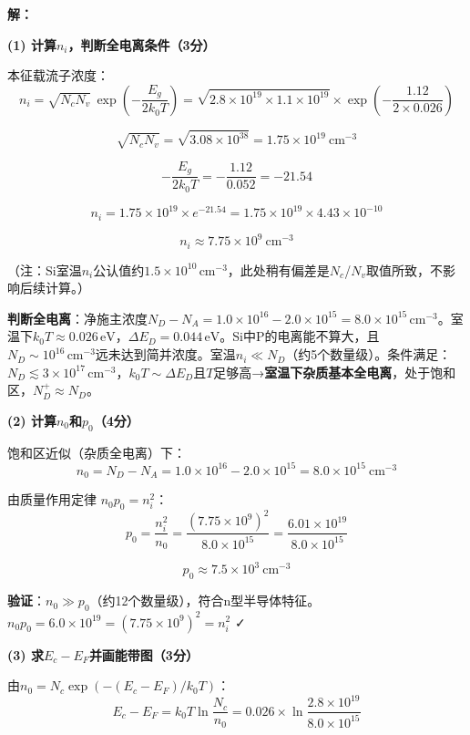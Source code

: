 \documentclass[12pt,a4paper]{ctexart}
\begin{document}
\textbf{解：}

\noindent\textbf{(1) 计算$n_i$，判断全电离条件（3分）}

本征载流子浓度：
\[
n_i = \sqrt{N_c N_v}\,\exp\left(-\frac{E_g}{2k_0T}\right)
= \sqrt{2.8 \times 10^{19} \times 1.1 \times 10^{19}} \times \exp\left(-\frac{1.12}{2 \times 0.026}\right)
\]

\[
\sqrt{N_c N_v} = \sqrt{3.08 \times 10^{38}} = 1.75 \times 10^{19}\ \text{cm}^{-3}
\]

\[
-\frac{E_g}{2k_0T} = -\frac{1.12}{0.052} = -21.54
\]

\[
n_i = 1.75 \times 10^{19} \times e^{-21.54}
= 1.75 \times 10^{19} \times 4.43 \times 10^{-10}
\]

\[
\boxed{n_i \approx 7.75 \times 10^9\ \text{cm}^{-3}}
\]

（注：Si室温$n_i$公认值约$1.5\times10^{10}\,\text{cm}^{-3}$，此处稍有偏差是$N_c$/$N_v$取值所致，不影响后续计算。）

\textbf{判断全电离}：净施主浓度$N_D - N_A = 1.0\times10^{16} - 2.0\times10^{15} = 8.0\times10^{15}\,\text{cm}^{-3}$。室温下$k_0T \approx 0.026\,\text{eV}$，$\Delta E_D = 0.044\,\text{eV}$。Si中P的电离能不算大，且$N_D \sim 10^{16}\,\text{cm}^{-3}$远未达到简并浓度。室温$n_i \ll N_D$（约5个数量级）。条件满足：$N_D \lesssim 3\times10^{17}\,\text{cm}^{-3}$，$k_0T \sim \Delta E_D$且$T$足够高→\textbf{室温下杂质基本全电离}，处于饱和区，$N_D^+ \approx N_D$。

\vspace{6pt}

\noindent\textbf{(2) 计算$n_0$和$p_0$（4分）}

饱和区近似（杂质全电离）下：
\[
n_0 = N_D - N_A = 1.0 \times 10^{16} - 2.0 \times 10^{15}
= \boxed{8.0 \times 10^{15}\ \text{cm}^{-3}}
\]

由质量作用定律 $n_0 p_0 = n_i^2$：
\[
p_0 = \frac{n_i^2}{n_0} = \frac{(7.75 \times 10^9)^2}{8.0 \times 10^{15}}
= \frac{6.01 \times 10^{19}}{8.0 \times 10^{15}}
\]

\[
\boxed{p_0 \approx 7.5 \times 10^3\ \text{cm}^{-3}}
\]

\textbf{验证}：$n_0 \gg p_0$（约12个数量级），符合n型半导体特征。$n_0 p_0 = 6.0\times10^{19} = (7.75\times10^9)^2 = n_i^2$ ✓

\vspace{6pt}

\noindent\textbf{(3) 求$E_c - E_F$并画能带图（3分）}

由$n_0 = N_c \exp(-(E_c-E_F)/k_0T)$：
\[
E_c - E_F = k_0T \ln\frac{N_c}{n_0}
= 0.026 \times \ln\frac{2.8 \times 10^{19}}{8.0 \times 10^{15}}
\]
\end{document}
